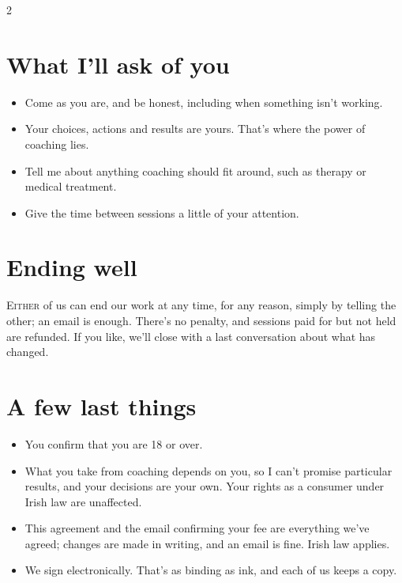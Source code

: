 \documentclass[9pt]{extarticle}
\newcommand{\initial}[2]{\lettrine[lines=2, loversize=.08, lraise=.02]{#1}{#2}}
\begin{document}
\begin{multicols}{2}
\section{What I'll ask of you}
\begin{itemize}
  \item Come as you are, and be honest, including when something isn't working.
  \item Your choices, actions and results are yours. That's where the power of coaching lies.
  \item Tell me about anything coaching should fit around, such as therapy or medical treatment.
  \item Give the time between sessions a little of your attention.
\end{itemize}

\section{Ending well}
\initial{E}{ither} of us can end our work at any time, for any reason, simply by telling the other; an email is enough. There's no penalty, and sessions paid for but not held are refunded. If you like, we'll close with a last conversation about what has changed.

\section{A few last things}
\begin{itemize}
  \item You confirm that you are 18 or over.
  \item What you take from coaching depends on you, so I can't promise particular results, and your decisions are your own. Your rights as a consumer under Irish law are unaffected.
  \item This agreement and the email confirming your fee are everything we've agreed; changes are made in writing, and an email is fine. Irish law applies.
  \item We sign electronically. That's as binding as ink, and each of us keeps a copy.
\end{itemize}

\end{multicols}
\end{document}
